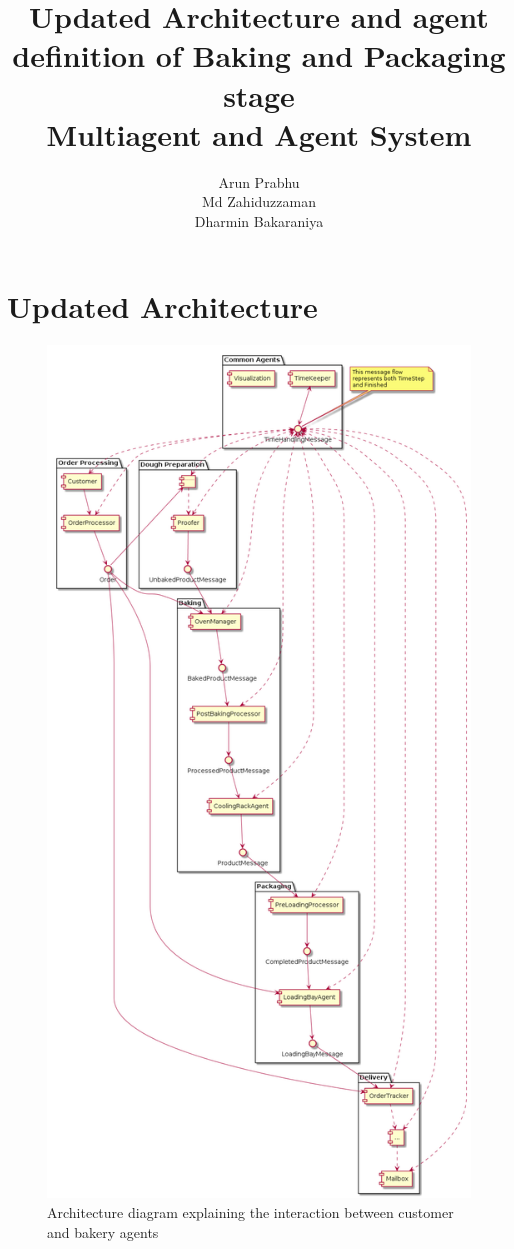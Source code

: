 \documentclass[12pt]{article}
\title{Updated Architecture and agent definition of Baking and Packaging stage\\Multiagent and Agent System}
\author{Arun Prabhu\\Md Zahiduzzaman\\Dharmin Bakaraniya}
\begin{document}
\maketitle{}
\pagebreak
\section{Updated Architecture}%
\label{sec:architecture}

\begin{figure}[htpb]
    \centering
    \includegraphics[width=0.46\linewidth]{component_diagram.png}
    \caption{Architecture diagram explaining the interaction between customer and bakery agents}\label{fig:somename}
\end{figure}

\pagebreak
\end{document}
